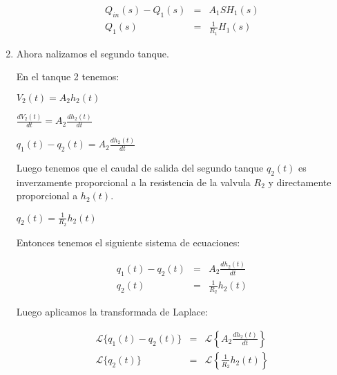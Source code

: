 \documentclass[12pt]{article}
\begin{document}
\begin{enumerate}
\setcounter{equation}{0}
    \begin{eqnarray}
      Q_{in}(s) - Q_{1}(s) &=& A_{1}SH_{1}(s) \\[2mm]
      Q_{1}(s) &=& \frac{1}{R_{1}}H_{1}(s)
    \end{eqnarray}
  \item Ahora nalizamos el segundo tanque.\\


    En el tanque 2 tenemos: 

    \(\displaystyle V_{2}(t)=A_{2}h_{2}(t)\)

    \( \displaystyle \frac{dV_{2}(t)}{dt}=A_{2}\frac{dh_{2}(t)}{dt} \)

    \( \displaystyle q_{1}(t)-q_{2}(t) = A_{2}\frac{dh_{2}(t)}{dt} \)

    Luego tenemos que el caudal de salida del segundo tanque $q_{2}(t)$ es inverzamente
    proporcional a la resistencia de la valvula $R_{2}$ y directamente proporcional a $h_{2}(t)$.

    \( \displaystyle q_{2}(t)=\frac{1}{R_{2}}h_{2}(t)\)

    Entonces tenemos el siguiente sistema de ecuaciones:

    \begin{eqnarray*}
      q_{1}(t) - q_{2}(t) &=& A_{2}\frac{dh_{2}(t)}{dt} \\
      q_{2}(t) &=& \frac{1}{R_{2}}h_{2}(t)
    \end{eqnarray*}

    Luego aplicamos la transformada de Laplace:
 
    \begin{eqnarray*}
      \mathscr{L}\{q_{1}(t) - q_{2}(t)\} &=& \mathscr{L} \left\{ A_{2}\frac{dh_{2}(t)}{dt} \right\} \\[2mm]
      \mathscr{L}\{q_{2}(t)\} &=&\mathscr{L} \left \{ \frac{1}{R_{2}}h_{2}(t) \right\}
    \end{eqnarray*}


\end{enumerate}
\end{document}
